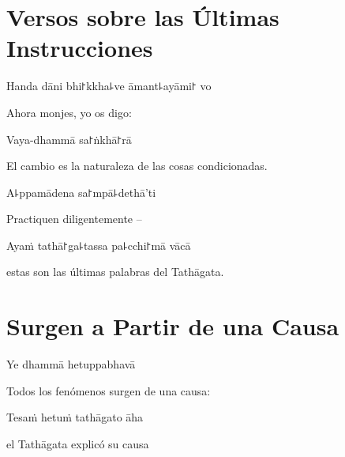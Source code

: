 \chapter[Las Últimas Instrucciones]{Versos sobre las Últimas Instrucciones}


\begin{leader}
\end{leader}

Handa dāni bhi꜓kkha꜕ve āmant꜕ayāmi꜓ vo

\begin{english}
  Ahora monjes, yo os digo:
\end{english}

Vaya-dhammā sa꜓ṅkhā꜓rā

\begin{english}
  El cambio es la naturaleza de las cosas condicionadas.
\end{english}

A꜕ppamādena sa꜓mpā꜕dethā'ti

\begin{english}
  Practiquen diligentemente --
\end{english}

Ayaṁ tathā꜓ga꜕tassa pa꜕cchi꜓mā vācā

\begin{english}
  estas son las últimas palabras del Tathāgata.
\end{english}

\chapter{Surgen a Partir de una Causa}


\begin{leader}
\end{leader}

Ye dhammā hetuppabhavā

\begin{english}
  Todos los fenómenos surgen de una causa:
\end{english}

Tesaṁ hetuṁ tathāgato āha

\begin{english}
  el Tathāgata explicó su causa
\end{english}

